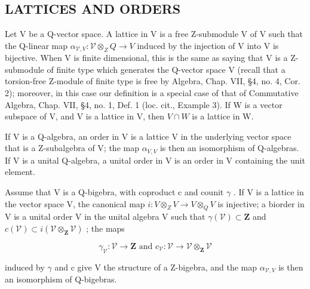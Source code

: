 \subsection{LATTICES AND ORDERS}

Let V be a Q-vector space. A lattice in V is a free Z-submodule V of V such that the Q-linear map \(\alpha_{\mathcal{V},V} : \mathcal{V} \otimes_{Z} Q \to V\) induced by the injection of V into V is bijective. When V is finite dimensional, this is the same as saying that V is a Z-submodule of finite type which generates the Q-vector space V (recall that a torsion-free Z-module of finite type is free by Algebra, Chap. VII, §4, no. 4, Cor. 2); moreover, in this case our definition is a special case of that of Commutative Algebra, Chap. VII, §4, no. 1, Def. 1 (loc. cit., Example 3). If W is a vector subspace of V, and V is a lattice in V, then \(V \cap W\) is a lattice in W.

If V is a Q-algebra, an order in V is a lattice V in the underlying vector space that is a Z-subalgebra of V; the map \(\alpha_{V,V}\) is then an isomorphism of Q-algebras. If V is a unital Q-algebra, a unital order in V is an order in V containing the unit element.

Assume that V is a Q-bigebra, with coproduct c and counit \(\gamma\) . If V is a lattice in the vector space V, the canonical map \(i: V \otimes_{Z} V \to V \otimes_{Q} V\) is injective; a biorder in V is a unital order V in the unital algebra V such that \(\gamma(\mathcal{V}) \subset \mathbf{Z}\) and \(c(\mathcal{V}) \subset i(\mathcal{V} \otimes_{\mathbf{Z}} \mathcal{V})\) ; the maps

\[
\gamma_ {\mathcal {V}} \colon \mathcal {V} \to \mathbf {Z} \text { and } c _ {\mathcal {V}} \colon \mathcal {V} \to \mathcal {V} \otimes_ {\mathbf {Z}} \mathcal {V}
\]

induced by \(\gamma\) and c give V the structure of a Z-bigebra, and the map \(\alpha_{\mathcal{V},V}\) is then an isomorphism of Q-bigebras.

